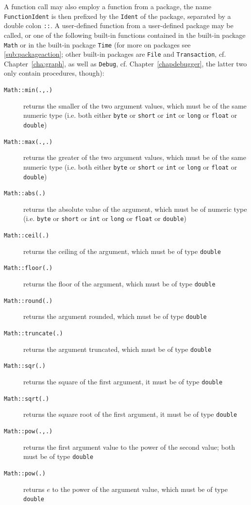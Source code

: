 A function call may also employ a function from a package, the name \texttt{FunctionIdent} is then prefixed by the \texttt{Ident} of the package, separated by a double colon \texttt{::}.
A user-defined function from a user-defined package may be called, or one of the following built-in functions contained in the built-in package \texttt{Math} or in the built-in package \texttt{Time} (for more on packages see \ref{sub:packageaction}; other built-in packages are \texttt{File} and \texttt{Transaction}, cf. Chapter~\ref{cha:graph}, as well as \texttt{Debug}, cf. Chapter~\ref{chapdebugger}, the latter two only contain procedures, though):

\begin{description}
\item[\texttt{Math::min(.,.)}] returns the smaller of the two argument values, which must be of the same numeric type (i.e. both either \texttt{byte} or \texttt{short} or \texttt{int} or \texttt{long} or \texttt{float} or \texttt{double})
\item[\texttt{Math::max(.,.)}] returns the greater of the two argument values, which must be of the same numeric type (i.e. both either \texttt{byte} or \texttt{short} or \texttt{int} or \texttt{long} or \texttt{float} or \texttt{double})
\item[\texttt{Math::abs(.)}] returns the absolute value of the argument, which must be of numeric type (i.e. \texttt{byte} or \texttt{short} or \texttt{int} or \texttt{long} or \texttt{float} or \texttt{double})
\item[\texttt{Math::ceil(.)}] returns the ceiling of the argument, which must be of type \texttt{double}
\item[\texttt{Math::floor(.)}] returns the floor of the argument, which must be of type \texttt{double}
\item[\texttt{Math::round(.)}] returns the argument rounded, which must be of type \texttt{double}
\item[\texttt{Math::truncate(.)}] returns the argument truncated, which must be of type \texttt{double}
\item[\texttt{Math::sqr(.)}] returns the square of the first argument, it must be of type \texttt{double}
\item[\texttt{Math::sqrt(.)}] returns the square root of the first argument, it must be of type \texttt{double}
\item[\texttt{Math::pow(.,.)}] returns the first argument value to the power of the second value; both must be of type \texttt{double}
\item[\texttt{Math::pow(.)}] returns $e$ to the power of the argument value, which must be of type \texttt{double}

\end{description}
